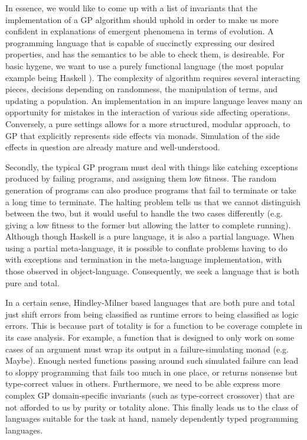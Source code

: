 \documentclass{acm_proc_article-sp}
\begin{document}
In essence, we would like to come up with a list of invariants that
the implementation of a GP algorithm should uphold in order to make us
more confident in explanations of emergent phenomena in terms of
evolution. A programming language that is capable of succinctly
expressing our desired properties, and has the semantics to be able to
check them, is desireable. For basic hygene, we want to use a purely
functional language (the most popular example being Haskell
\cite{to:do}). The complexity of algorithm requires several
interacting pieces, decisions depending on randomness, the
manipulation of terms, and updating a population. An implementation in
an impure language leaves many an opportunity for mistakes in the
interaction of various side affecting operations. Conversely, a pure
settings allows for a more structured, modular approach, to GP that
explicitly represents side effects via monads. Simulation of the side
effects in question are already mature and well-understood.

Secondly, the typical GP program must deal with things like catching
exceptions produced by failing programs, and assigning them low
fitness. The random generation of programs can also produce programs
that fail to terminate or take a long time to terminate. The halting
problem \cite{to:do} tells us that we cannot distinguish between the
two, but it would useful to handle the two cases differently
(e.g. giving a low fitness to the former but allowing the latter to
complete running). Although though Haskell is a pure language, it is
also a partial language. When using a partial meta-language, it is
possible to conflate problems having to do with exceptions and
termination in the meta-language implementation, with those observed
in object-language. Consequently, we seek a language that is both pure
and total.

In a certain sense, Hindley-Milner based languages that are both pure
and total just shift errors from being classified as runtime errors to
being classified as logic errors. This is because part of totality is
for a function to be coverage complete in its case analysis. For
example, a function that is designed to only work on some cases of an
argument must wrap its output in a failure-simulating monad
(e.g. Maybe). Enough nested functions passing around such simulated
failure can lead to sloppy programming that fails too much in one
place, or returns nonsense but type-correct values in
others. Furthermore, we need to be able express more complex GP
domain-specific invariants (such as type-correct crossover) that are
not afforded to us by purity or totality alone. This finally leads us
to the class of languages suitable for the task at hand, namely
dependently typed programming languages.
\end{document}
